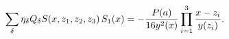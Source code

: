 \begin{equation}
\sum_\delta \eta_\delta Q_\delta S(x,z_1,z_2,z_3) \,  S_1(x)  = -
{P(a)\over16  y^2(x) } \prod_{i=1}^3 {x-z_i\over y(z_i)} .
\end{equation}

